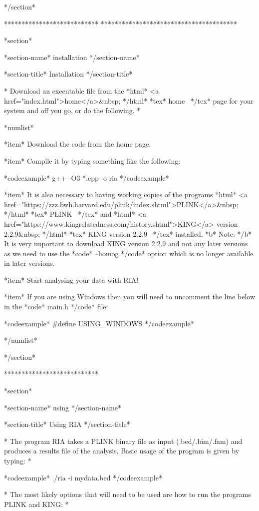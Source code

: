 */section*

***************************
***************************************

*section*

*section-name* installation */section-name*

*section-title* Installation */section-title*

*
Download an executable file from the *html* <a href="index.html">home</a>&nbsp; */html* *tex* home~ */tex* page for your system and off you go, or do the following.
*

*numlist*

*item* Download the code from the home page.

*item* Compile it by typing something like the following:

*codeexample*
g++ -O3 *.cpp -o ria
*/codeexample*

*item* It is also necessary to having working copies of the programs *html* <a href="https://zzz.bwh.harvard.edu/plink/index.shtml">PLINK</a>&nbsp; */html* *tex* PLINK~ */tex* and *html* <a href="https://www.kingrelatedness.com/history.shtml">KING</a> version 2.2.9&nbsp; */html* *tex* KING version 2.2.9~ */tex* installed. *b* Note: */b* It is very important to download KING version 2.2.9 and not any later versions as we need to use the *code* --homog */code* option which is no longer available in later versions.

*item* Start analysing your data with RIA!

*item* If you are using Windows then you will need to uncomment the line below in the *code* main.h */code* file:

*codeexample*
#define USING_WINDOWS
*/codeexample*

*/numlist*

*/section*

***************************

*section*

*section-name*
using
*/section-name*

*section-title*
Using RIA
*/section-title*

*
The program RIA takes a PLINK binary file as input (.bed/.bim/.fam) and produces a results file of the analysis. Basic usage of the program is given by typing:
*

*codeexample*
./ria -i mydata.bed
*/codeexample*

*
The most likely options that will need to be used are how to run the programs PLINK and KING:
*

